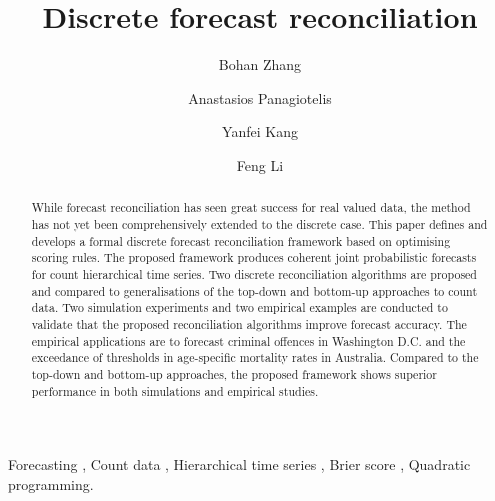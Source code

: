 \documentclass[a4paper,review,12pt,authoryear]{elsarticle}
\begin{document}
\begin{frontmatter}

  \title{Discrete forecast reconciliation}

  \author[label1]{Bohan Zhang}
  \address[label1]{School of Economics and Management, Beihang University, Beijing, China}
  \author[label2]{Anastasios Panagiotelis}
  \author[label1]{Yanfei Kang}

  \author[label3]{Feng Li}

  \address[label2]{The University of Sydney Business School, NSW 2006, Australia}
  \address[label3]{School of Statistics and Mathematics, Central University of Finance and Economics, Beijing, China}

  \begin{abstract}

    While forecast reconciliation has seen great success for real valued data, the method has not yet been comprehensively extended to the discrete case. This paper defines and develops a formal discrete forecast reconciliation framework based on optimising scoring rules. The proposed framework produces coherent joint probabilistic forecasts for count hierarchical time series.
    Two discrete reconciliation algorithms are proposed and compared to generalisations of the top-down and bottom-up approaches to count data. Two simulation experiments and two empirical examples are conducted to validate that the proposed reconciliation algorithms improve forecast accuracy. The empirical applications are to forecast  criminal offences in Washington D.C. and the exceedance of thresholds in age-specific mortality rates in Australia. Compared to the top-down and bottom-up approaches, the proposed framework shows superior performance in both simulations and empirical studies.

  \end{abstract}

  \begin{keyword}
  Forecasting \sep
  Count data \sep
  Hierarchical time series \sep
  Brier score \sep
  Quadratic programming.
  \end{keyword}

\end{frontmatter}

\newpage
\end{document}
